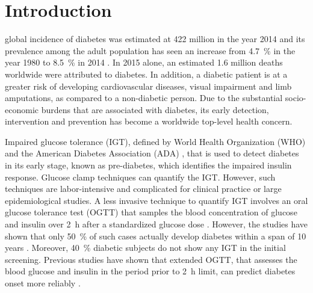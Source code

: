 \documentclass[journal,comsoc]{IEEEtran}
\begin{document}
\section{Introduction}
%
%
%
%
 global incidence of diabetes was estimated at \num{422} million in the year \num{2014} and its prevalence among the adult population has seen an increase from \SI{4.7}{\percent} in the year \num{1980} to \SI{8.5}{\percent} in \num{2014} \cite{mathers_projections_2006}. In \num{2015} alone, an estimated \num{1.6} million deaths worldwide were attributed to diabetes. In addition, a diabetic patient is at a greater risk of developing cardiovascular diseases, visual impairment and limb amputations, as compared to a non-diabetic person. Due to the substantial socio-economic burdens that are associated with diabetes, its early detection, intervention and prevention has become a worldwide top-level health concern.


Impaired glucose tolerance (IGT), defined by World Health Organization (WHO) \cite{organization_definition_2006} and the American Diabetes Association (ADA) \cite{american_diabetes_association_diagnosis_2005}, that is used to detect diabetes in its early stage, known as pre-diabetes, which identifies the impaired insulin response. Glucose clamp techniques can quantify the IGT. However, such techniques are labor-intensive and complicated for clinical practice or large epidemiological studies. A less invasive technique to quantify IGT involves an oral glucose tolerance test (OGTT) that samples the blood concentration of glucose and insulin over \SI{2}{\hour} after a standardized glucose dose  \cite{tschritter_assessing_2003}. However, the studies have shown that only \SI{50}{\percent} of such cases actually develop diabetes within a span of \num{10} years \cite{shaw_impaired_1999, writing_committee_impaired_2002}. Moreover, \SI{40}{\percent} diabetic subjects do not show any IGT in the initial screening. Previous studies have shown that extended OGTT, that assesses the blood glucose and insulin in the period prior to \SI{2}{\hour} limit, can predict diabetes onset more reliably \cite{abdul-ghani_what_2007}.
\end{document}
